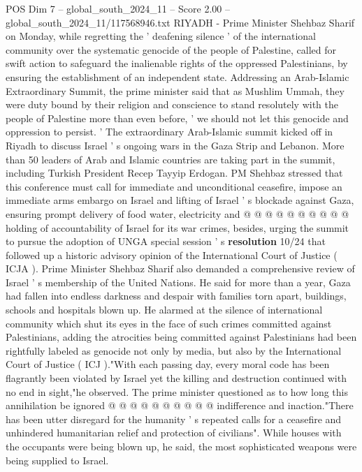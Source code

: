 \begin{textsample}{POS Dim 7 – global\_south\_2024\_11 – Score 2.00 – global\_south\_2024\_11/117568946.txt}  \label{ex:f7_pos_013}
RIYADH - Prime Minister Shehbaz Sharif on Monday, while regretting the ' deafening silence ' of the international community over the systematic genocide of the people of Palestine, called for swift action to safeguard the inalienable rights of the oppressed Palestinians, by ensuring the establishment of an independent state.
Addressing an Arab-Islamic Extraordinary Summit, the prime minister said that as Mushlim Ummah, they were duty bound by their religion and conscience to stand resolutely with the people of Palestine more than even before, ' we should not let this genocide and oppression to persist. ' The extraordinary Arab-Islamic summit kicked off in Riyadh to discuss Israel ' s ongoing wars in the Gaza Strip and Lebanon.
More than 50 leaders of Arab and Islamic countries are taking part in the summit, including Turkish President Recep Tayyip Erdogan.
PM Shehbaz stressed that this conference must call for immediate and unconditional ceasefire, impose an immediate arms embargo on Israel and lifting of Israel ' s blockade against Gaza, ensuring prompt delivery of food water, electricity and @ @ @ @ @ @ @ @ @ @ holding of accountability of Israel for its war crimes, besides, urging the summit to pursue the adoption of UNGA special session ' s \textbf{resolution} 10/24 that followed up a historic advisory opinion of the International Court of Justice ( ICJA ).
Prime Minister Shehbaz Sharif also demanded a comprehensive review of Israel ' s membership of the United Nations.
He said for more than a year, Gaza had fallen into endless darkness and despair with families torn apart, buildings, schools and hospitals blown up.
He alarmed at the silence of international community which shut its eyes in the face of such crimes committed against Palestinians, adding the atrocities being committed against Palestinians had been rightfully labeled as genocide not only by media, but also by the International Court of Justice ( ICJ )."With each passing day, every moral code has been flagrantly been violated by Israel yet the killing and destruction continued with no end in sight,"he observed.
The prime minister questioned as to how long this annihilation be ignored @ @ @ @ @ @ @ @ @ @ indifference and inaction."There has been utter disregard for the humanity ' s repeated calls for a ceasefire and unhindered humanitarian relief and protection of civilians".
While houses with the occupants were being blown up, he said, the most sophisticated weapons were being supplied to Israel.

\end{textsample}
